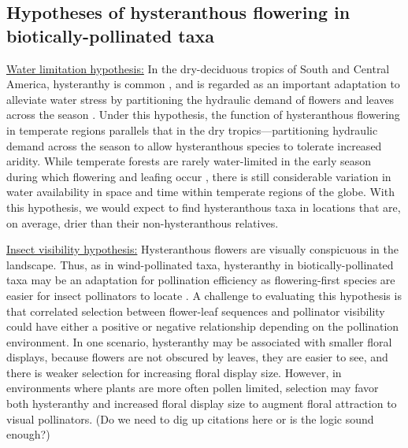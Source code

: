 \documentclass{article}[12pt]
\begin{document}
\subsection*{Hypotheses of hysteranthous flowering in biotically-pollinated taxa}

\underline{Water limitation hypothesis:} In the dry-deciduous tropics of South and Central America, hysteranthy is common \citep{Rathcke_1985,Franklin2016}, and is regarded as an important adaptation to alleviate water stress by partitioning the hydraulic demand of flowers and leaves across the season \citep{Gougherty2018,Franklin2016,Borchert1983,Reich1984}. Under this hypothesis, the function of hysteranthous flowering in temperate regions parallels that in the dry tropics---partitioning hydraulic demand across the season to allow hysteranthous species to tolerate increased aridity. While temperate forests are rarely water-limited in the early season during which flowering and leafing occur \citep{Polgar2011}, there is still considerable variation in water availability in space and time within temperate regions of the globe.  With this hypothesis, we would expect to find hysteranthous taxa in locations that are, on average, drier than their non-hysteranthous relatives.

\underline{Insect visibility hypothesis:} Hysteranthous flowers are visually conspicuous in the landscape. Thus, as in wind-pollinated taxa, hysteranthy in biotically-pollinated taxa may be an adaptation for pollination efficiency as flowering-first species are easier for insect pollinators to locate \citep{Janzen1967}. A challenge to evaluating this hypothesis is that correlated selection between flower-leaf sequences and pollinator visibility could have either a positive or negative relationship depending on the pollination environment. In one scenario, hysteranthy may be associated with smaller floral displays, because flowers are not obscured by leaves, they are easier to see, and there is weaker selection for increasing floral display size. However, in environments where plants are more often pollen limited, selection may favor both hysteranthy and increased floral display size to augment floral attraction to visual pollinators. (Do we need to dig up citations here or is the logic sound enough?)

\end{document}
